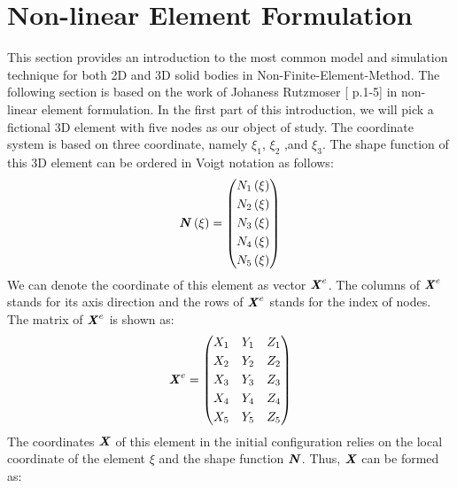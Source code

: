 \section{Non-linear Element Formulation}
This section provides an introduction to the most common model and simulation technique for both 2D and 3D solid bodies in Non-Finite-Element-Method. The following section is based on the work of Johaness Rutzmoser [\cite{Johannes} p.1-5] in non-linear element formulation. In the first part of this introduction, we will pick a fictional 3D element with five nodes as our object of study. The coordinate system is based on three coordinate, namely $\xi_1$, $\xi_2$ ,and $\xi_3$. The shape function of this 3D element can be ordered in Voigt notation as follows:
\begin{equation}
 \textbf{\textit{N}}\left(\xi\right) = \begin{pmatrix}
 N_1\left(\xi\right)           \\[0.3em]
 N_2\left(\xi\right)            \\[0.3em]
 N_3\left(\xi\right)           \\[0.3em]
 N_4\left(\xi\right)         \\[0.3em]
 N_5\left(\xi\right)                            
\end{pmatrix}
\end{equation}
We can denote the coordinate of this element as vector $\textbf{\textit{X}}^e$. The columns of $\textbf{\textit{X}}^e$ stands for its axis direction and the rows of $\textbf{\textit{X}}^e$ stands for the index of nodes. The matrix of $\textbf{\textit{X}}^e$ is shown as:
\begin{equation}
\textbf{\textit{X}}^e = \begin{pmatrix}
X_1 & Y_1 & Z_1           \\[0.3em]
X_2 & Y_2 & Z_2             \\[0.3em]
X_3 & Y_3 & Z_3           \\[0.3em]
X_4 & Y_4 & Z_4          \\[0.3em]
X_5 & Y_5 & Z_5                            
\end{pmatrix}
\end{equation}	
The coordinates $\textbf{\textit{X}}$ of this element in the initial configuration relies on the local coordinate of the element $\xi$ and the shape function $\textbf{\textit{N}}$. Thus, $\textbf{\textit{X}}$ can be formed as:
